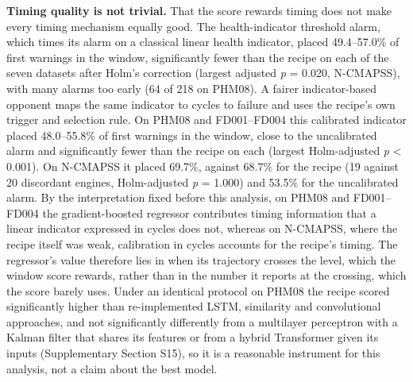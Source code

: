 \documentclass[a4paper,fleqn,doubleblind]{cas-dc}
\begin{document}
\textbf{Timing quality is not trivial.} That the score rewards timing does not make every timing mechanism equally good. The health-indicator threshold alarm, which times its alarm on a classical linear health indicator, placed 49.4--57.0\% of first warnings in the window, significantly fewer than the recipe on each of the seven datasets after Holm's correction (largest adjusted \textit{p} = 0.020, N-CMAPSS), with many alarms too early (64 of 218 on PHM08). A fairer indicator-based opponent maps the same indicator to cycles to failure and uses the recipe's own trigger and selection rule. On PHM08 and FD001--FD004 this calibrated indicator placed 48.0--55.8\% of first warnings in the window, close to the uncalibrated alarm and significantly fewer than the recipe on each (largest Holm-adjusted \textit{p} < 0.001). On N-CMAPSS it placed 69.7\%, against 68.7\% for the recipe (19 against 20 discordant engines, Holm-adjusted \textit{p} = 1.000) and 53.5\% for the uncalibrated alarm. By the interpretation fixed before this analysis, on PHM08 and FD001--FD004 the gradient-boosted regressor contributes timing information that a linear indicator expressed in cycles does not, whereas on N-CMAPSS, where the recipe itself was weak, calibration in cycles accounts for the recipe's timing. The regressor's value therefore lies in when its trajectory crosses the level, which the window score rewards, rather than in the number it reports at the crossing, which the score barely uses. Under an identical protocol on PHM08 the recipe scored significantly higher than re-implemented LSTM, similarity and convolutional approaches, and not significantly differently from a multilayer perceptron with a Kalman filter that shares its features or from a hybrid Transformer given its inputs (Supplementary Section S15), so it is a reasonable instrument for this analysis, not a claim about the best model.
\end{document}
